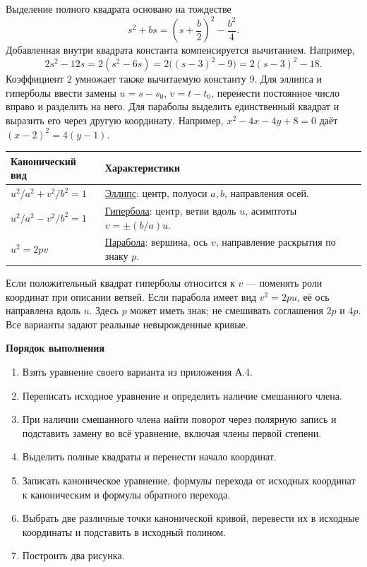 \documentclass[12pt,a4paper]{article}
\newcommand{\taskhead}[1]{\par\textbf{#1}\par}
\begin{document}
Выделение полного квадрата основано на тождестве
\[
s^2+bs=\left(s+\frac b2\right)^2-\frac{b^2}{4}.
\]
Добавленная внутри квадрата константа компенсируется вычитанием.
Например,
\[
2s^2-12s=2(s^2-6s)=2\bigl((s-3)^2-9\bigr)=2(s-3)^2-18.
\]
Коэффициент 2 умножает также вычитаемую константу 9.
Для эллипса и гиперболы ввести замены $u=s-s_0$, $v=t-t_0$,
перенести постоянное число вправо и разделить на него.
Для параболы выделить единственный квадрат и выразить его через
другую координату. Например,
$x^2-4x-4y+8=0$ даёт $(x-2)^2=4(y-1)$.

\begin{longtable}{p{}p{}}
\textbf{Канонический вид} & \textbf{Характеристики}\\\hline
$u^2/a^2+v^2/b^2=1$ & \underline{Эллипс}: центр, полуоси $a,b$, направления осей.\\
$u^2/a^2-v^2/b^2=1$ & \underline{Гипербола}: центр, ветви вдоль $u$, асимптоты $v=\pm(b/a)u$.\\
$u^2=2pv$ & \underline{Парабола}: вершина, ось $v$, направление раскрытия по знаку $p$.\\
\end{longtable}
Если положительный квадрат гиперболы относится к $v$ --- поменять роли
координат при описании ветвей. Если парабола имеет вид $v^2=2pu$,
её ось направлена вдоль $u$. Здесь $p$ может иметь знак;
не смешивать соглашения $2p$ и $4p$.
Все варианты задают реальные невырожденные кривые.

\taskhead{Порядок выполнения}
\begin{enumerate}
\item Взять уравнение своего варианта из приложения А.4.
\item Переписать исходное уравнение и определить наличие смешанного члена.
\item При наличии смешанного члена найти поворот через полярную запись и подставить
замену во всё уравнение, включая члены первой степени.
\item Выделить полные квадраты и перенести начало координат.
\item Записать каноническое уравнение, формулы перехода от исходных координат
к каноническим и формулы обратного перехода.
\item Выбрать две различные точки канонической кривой, перевести их в исходные координаты и подставить в исходный полином. 
\item Построить два рисунка.
\end{enumerate}
\end{document}
